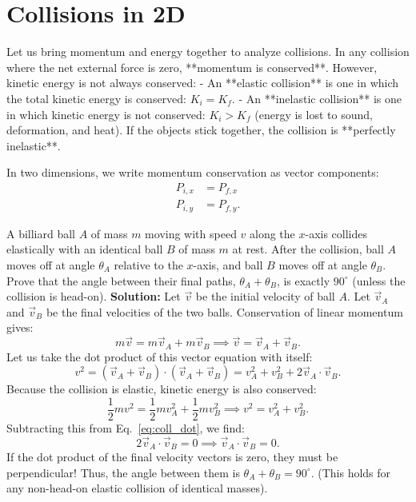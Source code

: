 \section{Collisions in 2D}

Let us bring momentum and energy together to analyze collisions. In any collision where the net external force is zero, **momentum is conserved**. However, kinetic energy is not always conserved:
- An **elastic collision** is one in which the total kinetic energy is conserved: $K_i = K_f$.
- An **inelastic collision** is one in which kinetic energy is not conserved: $K_i > K_f$ (energy is lost to sound, deformation, and heat). If the objects stick together, the collision is **perfectly inelastic**.

In two dimensions, we write momentum conservation as vector components:
\begin{align}
    P_{i,x} &= P_{f,x} \\
    P_{i,y} &= P_{f,y}.
\end{align}

\begin{workedexample}
A billiard ball $A$ of mass $m$ moving with speed $v$ along the $x$-axis collides elastically with an identical ball $B$ of mass $m$ at rest. After the collision, ball $A$ moves off at angle $\theta_A$ relative to the $x$-axis, and ball $B$ moves off at angle $\theta_B$.
Prove that the angle between their final paths, $\theta_A + \theta_B$, is exactly $90^\circ$ (unless the collision is head-on).
\newline
\textbf{Solution:}
Let $\vec{v}$ be the initial velocity of ball $A$. Let $\vec{v}_A$ and $\vec{v}_B$ be the final velocities of the two balls.
Conservation of linear momentum gives:
\begin{equation*}
    m\vec{v} = m\vec{v}_A + m\vec{v}_B \implies \vec{v} = \vec{v}_A + \vec{v}_B.
\end{equation*}
Let us take the dot product of this vector equation with itself:
\begin{equation}
    v^2 = (\vec{v}_A + \vec{v}_B) \cdot (\vec{v}_A + \vec{v}_B) = v_A^2 + v_B^2 + 2\vec{v}_A \cdot \vec{v}_B. \label{eq:coll_dot}
\end{equation}
Because the collision is elastic, kinetic energy is also conserved:
\begin{equation*}
    \frac{1}{2}mv^2 = \frac{1}{2}mv_A^2 + \frac{1}{2}mv_B^2 \implies v^2 = v_A^2 + v_B^2.
\end{equation*}
Subtracting this from Eq.~\eqref{eq:coll_dot}, we find:
\begin{equation*}
    2\vec{v}_A \cdot \vec{v}_B = 0 \implies \vec{v}_A \cdot \vec{v}_B = 0.
\end{equation*}
If the dot product of the final velocity vectors is zero, they must be perpendicular! Thus, the angle between them is $\theta_A + \theta_B = 90^\circ$. (This holds for any non-head-on elastic collision of identical masses).
\end{workedexample}


